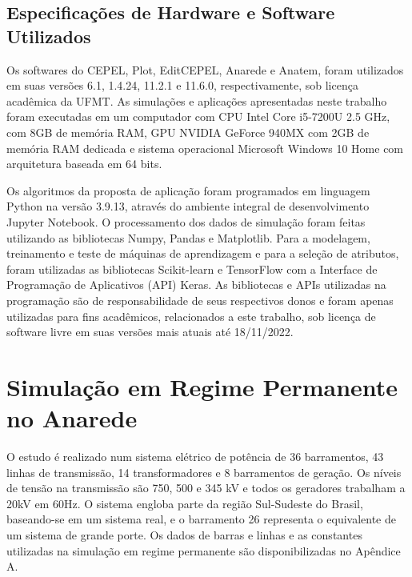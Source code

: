\documentclass[12pt,oneside,a4paper,chapter=TITLE,section=TITLE,sumario=tradicional,english,brazil]{abntex2}
\begin{document}
\subsection{Especificações de Hardware e Software Utilizados}
Os softwares do CEPEL, Plot, EditCEPEL, Anarede e Anatem, foram utilizados em suas versões 6.1, 1.4.24, 11.2.1 e 11.6.0, respectivamente, sob licença acadêmica da UFMT.  As simulações e aplicações apresentadas neste trabalho foram executadas em um computador com CPU Intel\textsuperscript{\textregistered} Core\textsuperscript{\texttrademark} i5-7200U 2.5 GHz, com 8GB de memória RAM, GPU NVIDIA\textsuperscript{\textregistered} GeForce\textsuperscript{\textregistered} 940MX com 2GB de memória RAM dedicada e sistema operacional Microsoft\textsuperscript{\textregistered} Windows\textsuperscript{\texttrademark} 10 Home com arquitetura baseada em 64 bits. \par 
Os algoritmos da proposta de aplicação foram programados em linguagem Python na versão 3.9.13, através do ambiente integral de desenvolvimento Jupyter Notebook. O processamento dos dados de simulação foram feitas utilizando as bibliotecas Numpy, Pandas e Matplotlib. Para a modelagem, treinamento e teste de máquinas de aprendizagem e para a seleção de atributos, foram utilizadas as bibliotecas Scikit-learn e TensorFlow com a Interface de Programação de Aplicativos (API) Keras. As bibliotecas e APIs utilizadas na programação são de responsabilidade de seus respectivos donos e foram apenas utilizadas para fins acadêmicos, relacionados a este trabalho, sob licença de software livre em suas versões mais atuais até 18/11/2022.\par 
\section{Simulação em Regime Permanente no Anarede}
O estudo é realizado num sistema elétrico de potência de 36 barramentos, 43 linhas de transmissão, 14 transformadores e 8 barramentos de geração. Os níveis de tensão na transmissão são 750, 500 e 345 kV e todos os geradores trabalham a 20kV em 60Hz. O sistema engloba parte da região Sul-Sudeste do Brasil, baseando-se em um sistema real, e o barramento 26 representa o equivalente de um sistema de grande porte. Os dados de barras e linhas e as constantes utilizadas na simulação em regime permanente são disponibilizadas no Apêndice A.\par
\end{document}
